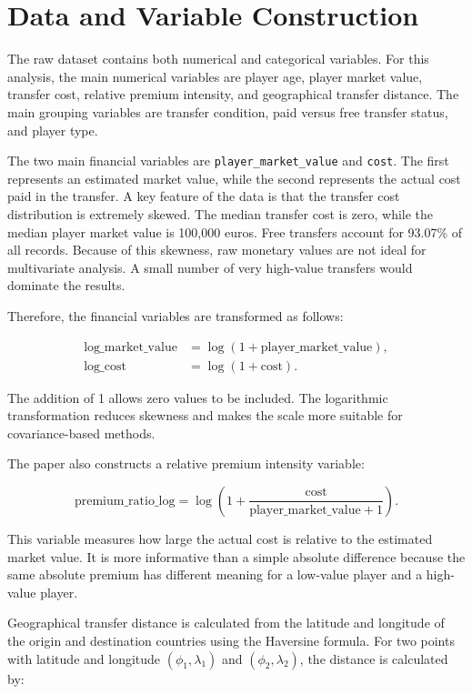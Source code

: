 \documentclass[12pt]{article}
\begin{document}
\section{Data and Variable Construction}

The raw dataset contains both numerical and categorical variables. For this analysis, the main numerical variables are player age, player market value, transfer cost, relative premium intensity, and geographical transfer distance. The main grouping variables are transfer condition, paid versus free transfer status, and player type.

The two main financial variables are \texttt{player\_market\_value} and \texttt{cost}. The first represents an estimated market value, while the second represents the actual cost paid in the transfer. A key feature of the data is that the transfer cost distribution is extremely skewed. The median transfer cost is zero, while the median player market value is 100,000 euros. Free transfers account for 93.07\% of all records. Because of this skewness, raw monetary values are not ideal for multivariate analysis. A small number of very high-value transfers would dominate the results.

Therefore, the financial variables are transformed as follows:

\begin{align}
\text{log\_market\_value} &= \log(1 + \text{player\_market\_value}),\\
\text{log\_cost} &= \log(1 + \text{cost}).
\end{align}

The addition of 1 allows zero values to be included. The logarithmic transformation reduces skewness and makes the scale more suitable for covariance-based methods.

The paper also constructs a relative premium intensity variable:

\begin{equation}
\text{premium\_ratio\_log}
= \log\left(1 + \frac{\text{cost}}{\text{player\_market\_value} + 1}\right).
\end{equation}

This variable measures how large the actual cost is relative to the estimated market value. It is more informative than a simple absolute difference because the same absolute premium has different meaning for a low-value player and a high-value player.

Geographical transfer distance is calculated from the latitude and longitude of the origin and destination countries using the Haversine formula. For two points with latitude and longitude $(\phi_1, \lambda_1)$ and $(\phi_2, \lambda_2)$, the distance is calculated by:
\end{document}
